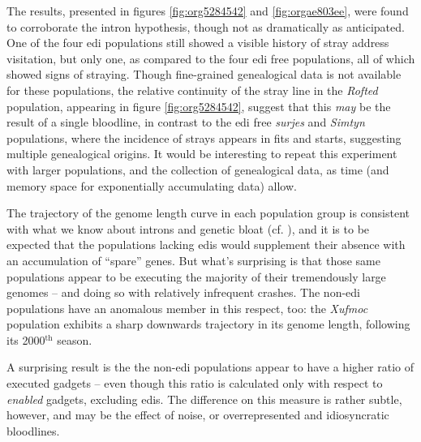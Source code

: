 \documentclass[12pt,glossary]{dalthesis}
\begin{document}
The results, presented in figures \ref{fig:org5284542} and
\ref{fig:orgae803ee}, were found to corroborate the intron hypothesis,
though not as dramatically as anticipated. One of the four \gls{edi} populations
still showed a visible history of stray address visitation, but only one, as
compared to the four \gls{edi} free populations, all of which showed signs of
straying. Though fine-grained genealogical data is not available for these
populations, the relative continuity of the stray line in the \emph{Rofted} population, 
appearing in figure \ref{fig:org5284542}, suggest that this \emph{may} be the
result of a single bloodline, in contrast to the \gls{edi} free \emph{surjes} and 
\emph{Simtyn} populations, where the incidence of strays appears in fits and starts, 
suggesting multiple genealogical origins. It would be interesting to repeat this
experiment with larger populations, and the collection of genealogical data, 
as time (and memory space for exponentially accumulating data) allow. 

The trajectory of the genome length curve in each population group is consistent
with what we know about introns and genetic bloat (cf. \cite{banzhaf98}), and
it is to be expected that the populations lacking \glspl{edi} would supplement
their absence with an accumulation of ``spare'' genes. But what's surprising is
that those same populations appear to be executing the majority of their
tremendously large genomes -- and doing so with relatively infrequent crashes. 
The non-\gls{edi} populations have an anomalous member in this respect, too:
the \emph{Xufmoc} population exhibits a sharp downwards trajectory in its genome
length, following its 2000\(^{\text{th}}\) season.  

A surprising result is the the non-\gls{edi} populations appear to have a higher
ratio of executed gadgets -- even though this ratio is calculated only with respect
to \emph{enabled} gadgets, excluding \glspl{edi}. The difference on this measure is rather
subtle, however, and may be the effect of noise, or overrepresented and idiosyncratic
bloodlines. 
\end{document}
